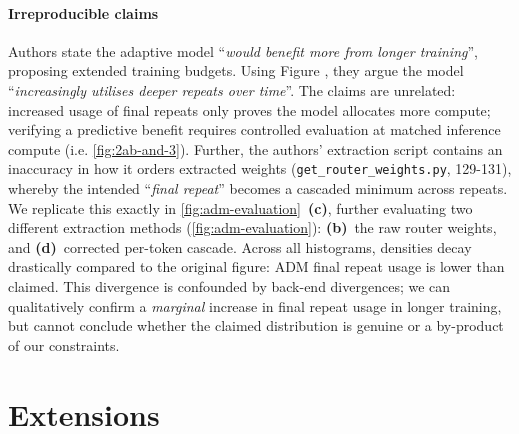 \documentclass[10pt, letterpaper]{article} %
\begin{document}
 \paragraph{Irreproducible claims} Authors state the adaptive model ``\emph{would benefit more from longer training}'', proposing extended training budgets. Using Figure \cite{cotformer}, they argue the model ``\emph{increasingly utilises deeper repeats over time}''. The claims are unrelated: increased usage of final repeats only proves the model allocates more compute; verifying a predictive benefit requires controlled evaluation at matched inference compute (i.e. \cref{fig:2ab-and-3}). Further, the authors' extraction script contains an inaccuracy in how it orders extracted weights (\texttt{get\_router\_weights.py}, 129-131), whereby the intended ``\emph{final repeat}'' becomes a cascaded minimum across repeats. We replicate this exactly in \cref{fig:adm-evaluation}~\textbf{(c)}, further evaluating two different extraction methods (\cref{fig:adm-evaluation}): \textbf{(b)}~the raw router weights, and \textbf{(d)}~corrected per-token cascade. Across all histograms, densities decay drastically compared to the original figure: ADM final repeat usage is lower than claimed. This divergence is confounded by back-end divergences; we can qualitatively confirm a \emph{marginal} increase in final repeat usage in longer training, but cannot conclude whether the claimed distribution is genuine or a by-product of our constraints.
\begin{table}[H]
\centering
{}
\caption{\centering Reproduced CoTFormer Section 5 PPL\cite{cotformer} comparison at 60k training steps.}
\label{tab:section5-pair}
\end{table}

\section{Extensions}
\end{document}
